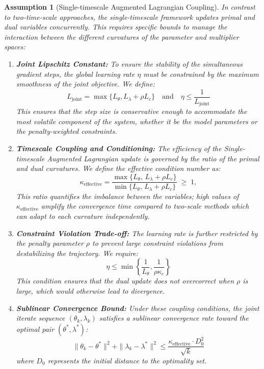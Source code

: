 \documentclass[preprint,12pt,authoryear]{elsarticle}
\newtheorem{assumption}{Assumption}
\begin{document}
\begin{assumption}[Single-timescale Augmented Lagrangian Coupling]\label{assump:single_scale}
In contrast to two-time-scale approaches, the single-timescale framework updates primal and dual variables concurrently. This requires specific bounds to manage the interaction between the different curvatures of the parameter and multiplier spaces:

\begin{enumerate}
    \item \textbf{Joint Lipschitz Constant:} To ensure the stability of the simultaneous gradient steps, the global learning rate $\eta$ must be constrained by the maximum smoothness of the joint objective. We define:
    \begin{equation}
        L_{\mathrm{joint}} = \max\{L_\theta, L_\lambda + \rho L_c\} \quad \text{and} \quad \eta \leq \frac{1}{L_{\mathrm{joint}}}
    \end{equation}
    This ensures that the step size is conservative enough to accommodate the most volatile component of the system, whether it be the model parameters or the penalty-weighted constraints.

    \item \textbf{Timescale Coupling and Conditioning:} The efficiency of the Single-timescale Augmented Lagrangian update is governed by the ratio of the primal and dual curvatures. We define the effective condition number as:
    \begin{equation}
\kappa_{\mathrm{effective}} = \frac{\max\{L_\theta,\, L_\lambda + \rho L_c\}}{\min\{L_\theta,\, L_\lambda + \rho L_c\}} \;\geq\; 1,
    \end{equation}
    This ratio quantifies the imbalance between the variables; high values of $\kappa_{\mathrm{effective}}$ amplify the convergence time compared to two-scale methods which can adapt to each curvature independently.

    \item \textbf{Constraint Violation Trade-off:} The learning rate is further restricted by the penalty parameter $\rho$ to prevent large constraint violations from destabilizing the trajectory. We require:
    \begin{equation}
        \eta \leq \min\left\{\frac{1}{L_\theta}, \frac{1}{\rho\kappa_c}\right\}
    \end{equation}
    This condition ensures that the dual update does not overcorrect when $\rho$ is large, which would otherwise lead to divergence.

    \item \textbf{Sublinear Convergence Bound:} Under these coupling conditions, the joint iterate sequence $(\theta_k, \lambda_k)$ satisfies a sublinear convergence rate toward the optimal pair $(\theta^*, \lambda^*)$:
    \begin{equation}
\|\theta_k - \theta^*\|^2 + \|\lambda_k - \lambda^*\|^2 \leq \frac{\kappa_{\mathrm{effective}} \cdot D_0^2}{\sqrt{k}}
    \end{equation}
    where $D_0$ represents the initial distance to the optimality set.
\end{enumerate}
\end{assumption}
\end{document}
